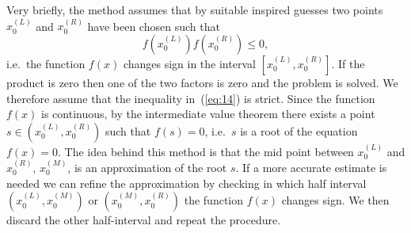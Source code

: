Very briefly, the method assumes that by suitable inspired guesses two
points $x_0^{(L)}$ and $x_0^{(R)}$ have been chosen such that
%
\begin{equation}
  f(x_0^{(L)}) f(x_0^{(R)}) \le 0 ,
  \label{eq:14}
\end{equation}
%
i.e.\ the function $f(x)$ changes sign in the interval $[x_0^{(L)},
x_0^{(R)}]$.   If the product is zero then one of the two factors is
zero and the problem is solved.   We therefore assume that the
inequality in~(\ref{eq:14}) is strict.   Since the
function $f(x)$ is continuous, by the intermediate value theorem there
exists a point $s \in (x_0^{(L)},x_0^{(R)})$ such that $f(s)=0$,
i.e.\ $s$ is a root of the equation $f(x)=0$.  The idea behind this
method is that the mid point between $x_0^{(L)}$ and $x_0^{(R)}$,
$x_0^{(M)}$, is an approximation of the root $s$.  If a more accurate
estimate is needed we can refine the approximation by checking in
which half interval $(x_0^{(L)},x_0^{(M)})$ or $(x_0^{(M)},x_0^{(R)})$
the function $f(x)$ changes sign.  We then discard the other
half-interval and repeat the procedure.

